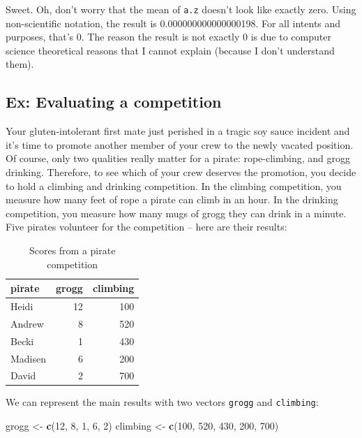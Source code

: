 \documentclass[]{book}
\newenvironment{Shaded}{\begin{snugshade}}{\end{snugshade}}
\newcommand{\KeywordTok}[1]{\textcolor[rgb]{0.13,0.29,0.53}{\textbf{{#1}}}}
\newcommand{\DecValTok}[1]{\textcolor[rgb]{0.00,0.00,0.81}{{#1}}}
\newcommand{\StringTok}[1]{\textcolor[rgb]{0.31,0.60,0.02}{{#1}}}
\newcommand{\NormalTok}[1]{{#1}}
\theoremstyle{definition}
\theoremstyle{definition}
\theoremstyle{remark}
\begin{document}
Sweet. Oh, don't worry that the mean of \texttt{a.z} doesn't look like
exactly zero. Using non-scientific notation, the result is
0.000000000000000198. For all intents and purposes, that's 0. The reason
the result is not exactly 0 is due to computer science theoretical
reasons that I cannot explain (because I don't understand them).

\subsection{Ex: Evaluating a
competition}\label{ex-evaluating-a-competition}

Your gluten-intolerant first mate just perished in a tragic soy sauce
incident and it's time to promote another member of your crew to the
newly vacated position. Of course, only two qualities really matter for
a pirate: rope-climbing, and grogg drinking. Therefore, to see which of
your crew deserves the promotion, you decide to hold a climbing and
drinking competition. In the climbing competition, you measure how many
feet of rope a pirate can climb in an hour. In the drinking competition,
you measure how many mugs of grogg they can drink in a minute. Five
pirates volunteer for the competition -- here are their results:

\begin{table}

\caption{\label{tab:unnamed-chunk-136}Scores from a pirate competition}
\centering
\begin{tabular}[t]{l|r|r}
\hline
pirate & grogg & climbing\\
\hline
Heidi & 12 & 100\\
\hline
Andrew & 8 & 520\\
\hline
Becki & 1 & 430\\
\hline
Madisen & 6 & 200\\
\hline
David & 2 & 700\\
\hline
\end{tabular}
\end{table}

We can represent the main results with two vectors \texttt{grogg} and
\texttt{climbing}:

\begin{Shaded}
\begin{Highlighting}[]
\NormalTok{grogg <-}\StringTok{ }\KeywordTok{c}\NormalTok{(}\DecValTok{12}\NormalTok{, }\DecValTok{8}\NormalTok{, }\DecValTok{1}\NormalTok{, }\DecValTok{6}\NormalTok{, }\DecValTok{2}\NormalTok{)}
\NormalTok{climbing <-}\StringTok{ }\KeywordTok{c}\NormalTok{(}\DecValTok{100}\NormalTok{, }\DecValTok{520}\NormalTok{, }\DecValTok{430}\NormalTok{, }\DecValTok{200}\NormalTok{, }\DecValTok{700}\NormalTok{)}
\end{Highlighting}
\end{Shaded}
\end{document}
